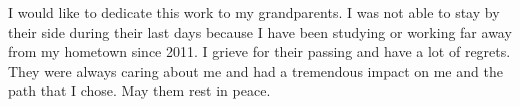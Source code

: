I would like to dedicate this work to my grandparents. I was not able to stay by their side during their last days because I have been studying or working far away from my hometown since 2011. I grieve for their passing and have a lot of regrets. They were always caring about me and had a tremendous impact on me and the path that I chose. May them rest in peace.